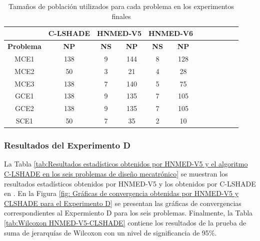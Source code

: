 \begin{table}[]
	\centering
	\caption{Tamaños de población utilizados para cada problema en los experimentos finales}
	\label{tab:Tamaños de población utilizados para cada problema en los experimentos finales}
	
	\begin{tabular}{cccccccccccc}
		& \textbf{C-LSHADE } & \multicolumn{2}{l}{\textbf{HNMED-V5}}&\multicolumn{2}{l}{\textbf{HNMED-V6}}\\
		\hline
		\textbf{Problema} & \textbf{NP}    & \textbf{NS} & \textbf{NP}& \textbf{NS}& \textbf{NP}\\
		\hline
		MCE1     & 138           & 9           & 144 &8&128   \\
		MCE2     & 50            & 3           & 21  &4&28       \\
		MCE3     & 138           & 7           & 140 &5&75      \\
		GCE1     & 138           & 9           & 135 &7&105        \\
		GCE2     & 138           & 9           & 135 &7&105    \\
		SCE1     & 50            & 7           & 35  &2&10       
	\end{tabular}
	
\end{table}


\subsubsection{Resultados del Experimento D}
La Tabla \ref{tab:Resultados estadísticos obtenidos por HNMED-V5 y el algoritmo C-LSHADE en los seis problemas de diseño mecatrónico} se muestran los resultados estadísticos obtenidos por HNMED-V5 y los obtenidos por C-LSHADE en \cite{zapata_zapata_control_2017}. En la Figura \ref{fig: Gráficas de convergencia obtenidas por HNMED-V5 y CLSHADE para el Experimento D} se presentan las gráficas de convergencias correspondientes al Expermiento D para los seis problemas. Finalmente, la Tabla \ref{tab:Wilcoxon HNMED-V5-CLSHADE} contiene los resultados de la prueba de suma de jerarquías de Wilcoxon con un nivel de significancia de 95\%.

